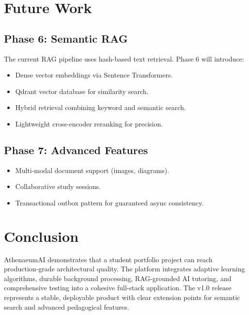 \documentclass[12pt,a4paper]{article}
\begin{document}
\section{Future Work}

\subsection{Phase 6: Semantic RAG}
The current RAG pipeline uses hash-based text retrieval. Phase 6 will introduce:
\begin{itemize}[leftmargin=1.5cm]
    \item Dense vector embeddings via Sentence Transformers.
    \item Qdrant vector database for similarity search.
    \item Hybrid retrieval combining keyword and semantic search.
    \item Lightweight cross-encoder reranking for precision.
\end{itemize}

\subsection{Phase 7: Advanced Features}
\begin{itemize}[leftmargin=1.5cm]
    \item Multi-modal document support (images, diagrams).
    \item Collaborative study sessions.
    \item Transactional outbox pattern for guaranteed async consistency.
\end{itemize}

\section{Conclusion}

AthenaeumAI demonstrates that a student portfolio project can reach production-grade architectural quality. The platform integrates adaptive learning algorithms, durable background processing, RAG-grounded AI tutoring, and comprehensive testing into a cohesive full-stack application. The v1.0 release represents a stable, deployable product with clear extension points for semantic search and advanced pedagogical features.
\end{document}
